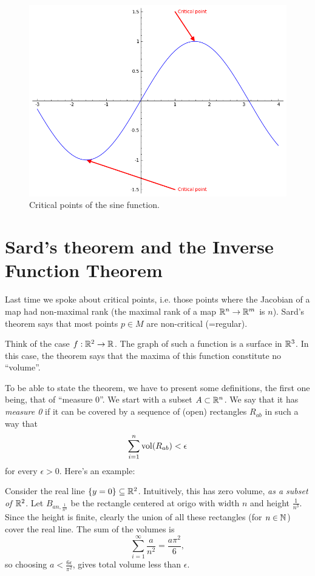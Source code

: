 \documentclass[11pt, english]{article}
\begin{document}
\begin{figure}[ht]
\begin{center}
\includegraphics[scale=0.7]{criticalpoints}
\end{center}
\caption{Critical points of the sine function.}
\label{criticalpoints}
\end{figure}

\newpage
\section{Sard's theorem and the Inverse Function Theorem}

Last time we spoke about critical points, i.e. those points where the Jacobian of a map had non-maximal rank (the maximal rank of a map $\mathbb{R}^n \to \mathbb{R}^m$ is $n$). Sard's theorem says that most points $p \in M$ are non-critical (=regular).

Think of the case $f:\mathbb{R}^2 \to \mathbb{R}$. The graph of such a function is a surface in $\mathbb{R}^3$. In this case, the theorem says that the maxima of this function constitute no ``volume''.

To be able to state the theorem, we have to present some definitions, the first one being, that of ``measure $0$''. We start with a subset $A \subset \mathbb{R}^n$. We say that it has \emph{measure 0} if it can be covered by a sequence of (open) rectangles $R_{ab}$ in such a way that
\[
\sum_{i=1}^n \operatorname{\mathrm{vol}}(R_{ab}) < \epsilon
\]
for every $\epsilon > 0$. Here's an example:

\begin{example}
Consider the real line $\{ y = 0 \} \subseteq \mathbb{R}^2$. Intuitively, this has zero volume, \emph{as a subset of $\mathbb{R}^2$}. Let $B_{an,{\frac{1}{n^3}}}$ be the rectangle centered at origo with width $n$ and height $\frac{1}{n^3}$.  Since the height is finite, clearly the union of all these rectangles (for $n \in \mathbb{N}$) cover the real line.  The sum of the volumes is
\[
\sum_{i=1}^\infty \frac{a}{n^2} = \frac{a \pi^2}{6},
\]
so choosing $a < \frac{6 \epsilon}{\pi^2}$, gives total volume less than $\epsilon$.
\end{example}
\end{document}
